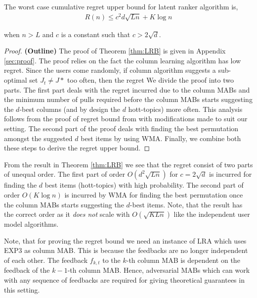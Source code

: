 \begin{theorem}
\label{thm:LRB}
The worst case cumulative regret upper bound for latent ranker algorithm is,
\begin{align*}
R(n) \leq c^2d \sqrt{L n} + K \log n
\end{align*}

when $n > L$ and $c$ is a constant such that $c > 2\sqrt{d}$.
\end{theorem}

\begin{proof} \textbf{(Outline)}
The proof of Theorem \ref{thm:LRB} is given in Appendix \ref{sec:proof}. The proof relies on the fact the column learning algorithm has  low regret. Since the users come randomly, if column algorithm suggests a sub-optimal set $J_t \neq J*$ too often, then the regret We divide the proof into two parts. The first part deals with the regret incurred due to the column MABs and the minimum number of pulls required before the column MABs starts suggesting the $d$-best columns (and by design the $d$ hott-topics) more often. This analysis follows from the proof of regret bound from \citet{radlinski2008learning} with modifications made to suit our setting. The second part of the proof deals with finding the best permutation amongst the suggested $d$ best items by using WMA. Finally, we combine both these steps to derive the regret upper bound.
\end{proof}

\begin{discussion}
\label{disc:proof1}
From the result in Theorem \ref{thm:LRB} we see that the regret consist of two parts of unequal order. The first part of order $O\left(d^2 \sqrt{L n} \right)$ for $c = 2\sqrt{d}$ is incurred for finding the $d$ best items (hott-topics) with high probability. The second part of order $O\left( K\log n\right)$ is incurred by WMA for finding the best permutation once the column MABs starts suggesting the $d$-best items. Note, that the result has the correct order as it \textit{does not} scale with $O\left(\sqrt{KLn}\right)$ like the independent user model algorithms.
\end{discussion}

\begin{discussion}
\label{disc:proof2}
Note, that for proving the regret bound we need an instance of LRA which uses EXP3 as column MAB. This is because the feedbacks are no longer independent of each other. The feedback $f_{k,t}$ to the $k$-th column MAB  is dependent on the feedback of the $k-1$-th column MAB. Hence, adversarial MABs which can work with any sequence of feedbacks are required for giving theoretical guarantees in this setting.
\end{discussion}
